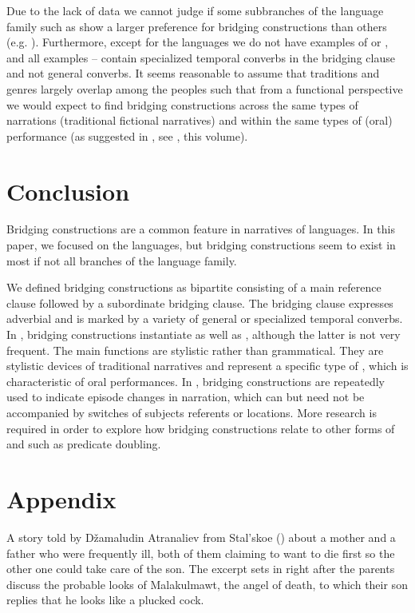 \documentclass[output=paper]{LSP/langsci}
\begin{document}
Due to the lack of data we cannot judge if some subbranches of the  language family such as  show a larger preference for bridging constructions than others (e.g. ). Furthermore, except for the  languages we do not have examples of  or , and all examples -- contain specialized temporal converbs in the bridging clause and not general converbs. It seems reasonable to assume that  traditions and genres largely overlap among the  peoples such that from a functional perspective we would expect to find bridging constructions across the same types of narrations (traditional fictional narratives) and within the same types of (oral) performance  (as suggested in , see \citeauthor{emlen18}, this volume). 


\section{Conclusion}
\label{sec:Conclusion}
Bridging constructions are a common feature in narratives of  languages. In this paper, we focused on the  languages, but bridging constructions seem to exist in most if not all branches of the  language family.

We defined bridging constructions as bipartite consisting of a main reference clause followed by a subordinate bridging clause. The bridging clause expresses adverbial  and is marked by a variety of general or specialized temporal converbs. In , bridging constructions instantiate  as well as , although the latter is not very frequent. The main functions are stylistic rather than grammatical. They are stylistic devices of traditional narratives and represent a specific type of , which is characteristic of oral performances. In ,  bridging constructions are repeatedly used to indicate episode changes in narration, which can but need not be accompanied by switches of subjects referents or locations. More research is required in order to explore how bridging constructions relate to other forms of  and  such as predicate doubling.
 

 \section*{Appendix}
 \setcounter{equation}{0}
A  story told by Džamaludin Atranaliev from Stal’skoe (\citealt[154--157]{vandenBerg.1995})  about a mother and a father who were frequently ill, both of them claiming to want to die first so the other one could take care of the son. The excerpt sets in right after the parents discuss the probable looks of Malakulmawt, the angel of death, to which their son replies that he looks like a plucked cock.
\end{document}
